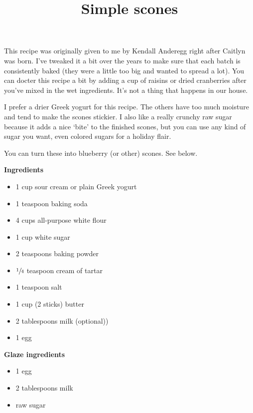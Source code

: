 \documentclass{article}
\title{Simple scones}
\begin{document}
This recipe was originally given to me by Kendall Anderegg right after Caitlyn was
born. I've tweaked it a bit over the years to make sure that each batch is consistently
baked (they were a little too big and wanted to spread a lot). You can docter this
recipe a bit by adding a cup of raisins or dried cranberries after you've mixed in
the wet ingredients. It's not a thing that happens in our house.

I prefer a drier Greek yogurt for this recipe. The others have too much moisture and
tend to make the scones stickier. I also like a really crunchy raw sugar because it
adds a nice `bite' to the finished scones, but you can use any kind of sugar you want,
even colored sugars for a holiday flair.

You can turn these into blueberry (or other) scones. See below.

\bigskip

\begin{multicols}{2}
      \textbf{Ingredients}

      \begin{itemize}
            \item 1 cup sour cream or plain Greek yogurt
            \item 1 teaspoon baking soda
            \item 4 cups all-purpose white flour
            \item 1 cup white sugar
            \item 2 teaspoons baking powder
            \item $\sfrac{1}{4}$ teaspoon cream of tartar
            \item 1 teaspoon salt
            \item 1 cup (2 sticks) butter
            \item 2 tablespoons milk (optional))
            \item 1 egg
      \end{itemize}

      \columnbreak

      \textbf{Glaze ingredients}
      \begin{itemize}
            \item 1 egg
            \item 2 tablespoons milk
            \item raw sugar
      \end{itemize}

\end{multicols}
\end{document}

